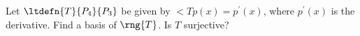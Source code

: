 Let $\ltdefn{T}{P_4}{P_3}$ be given by 
$\lt{T}{p(x)} = p^\prime(x)$, where $p^\prime(x)$ is the derivative.
Find a basis of $\rng{T}$.  
Is $T$ surjective?  
%